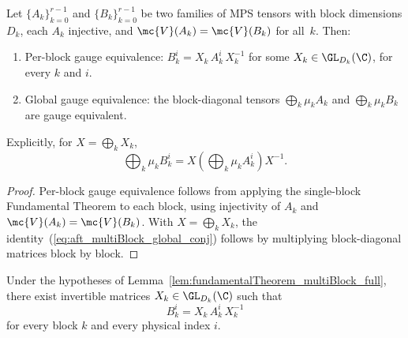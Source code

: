 \begin{lemma}%
    \label{lem:fundamentalTheorem_multiBlock_full}
    \leanok
    Let $\{A_k\}_{k=0}^{r-1}$ and $\{B_k\}_{k=0}^{r-1}$ be two families
    of MPS tensors with block dimensions $D_k$, each $A_k$ injective, and
    $\mc{V}(A_k) = \mc{V}(B_k)$ for all~$k$.
    Then:
    \begin{enumerate}
        \item Per-block gauge equivalence:
              $B_k^i = X_k\, A_k^i\, X_k^{-1}$ for some
              $X_k \in \GL_{D_k}(\C)$, for every $k$ and $i$.
        \item Global gauge equivalence: the block-diagonal tensors
              $\bigoplus_k \mu_k A_k$ and $\bigoplus_k \mu_k B_k$ are
              gauge equivalent.
    \end{enumerate}
    Explicitly, for $X=\bigoplus_k X_k$,
    \begin{equation}\label{eq:aft_multiBlock_global_conj}
        \bigoplus_k \mu_k B_k^i
        = X \left(\bigoplus_k \mu_k A_k^i\right) X^{-1}.
    \end{equation}
\end{lemma}

\begin{proof}\leanok{}
    Per-block gauge equivalence follows from applying the single-block
    Fundamental Theorem to each block, using injectivity of
    $A_k$ and $\mc{V}(A_k) = \mc{V}(B_k)$.
    With $X=\bigoplus_k X_k$, the identity~(\ref{eq:aft_multiBlock_global_conj})
    follows by multiplying block-diagonal matrices block by block.
\end{proof}

\begin{lemma}%
    \label{lem:fundamentalTheorem_multiBlock_explicit}
    \leanok
    Under the hypotheses of
    Lemma~\ref{lem:fundamentalTheorem_multiBlock_full}, there exist
    invertible matrices $X_k \in \GL_{D_k}(\C)$ such that
    \[
        B_k^i = X_k\, A_k^i\, X_k^{-1}
    \]
    for every block $k$ and every physical index $i$.
\end{lemma}


